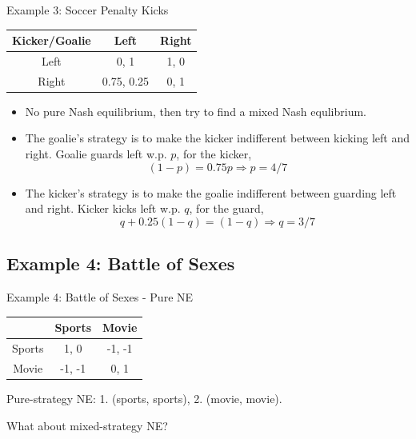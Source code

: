 \documentclass{beamer}
\begin{document}
\begin{frame}{Example 3: Soccer Penalty Kicks}
    \begin{table}[]
                \begin{tabular}{c|c|c|}
                \cline{2-3}
                        Kicker/Goalie       & Left       & Right    \\ \hline
                \multicolumn{1}{|c|}{Left}  & 0, 1       & 1, 0     \\ \hline
                \multicolumn{1}{|c|}{Right} & 0.75, 0.25 & 0, 1     \\ \hline
                \end{tabular}
    \end{table}

\begin{itemize}[<+-| alert@+>]
    \item No pure Nash equilibrium, then try to find a mixed Nash equlibrium.
    \item
    The goalie's strategy is to make the kicker indifferent between kicking left and right.
    Goalie guards left w.p. $p$, for the kicker,
    \[
    (1-p) = 0.75p \Rightarrow p = 4/7
    \]

    \item
    The kicker's strategy is to make the goalie indifferent between guarding left and right.
    Kicker kicks left w.p. $q$, for the guard,
    \[
    q + 0.25(1-q) = (1-q) \Rightarrow q = 3/7
    \] 
\end{itemize}

\end{frame}


\subsection{Example 4: Battle of Sexes}

\begin{frame}{Example 4: Battle of Sexes - Pure NE}
    \begin{table}[]
        \begin{tabular}{c|c|c|}
        \cline{2-3}
                                 & Sports    & Movie    \\ \hline
        \multicolumn{1}{|c|}{Sports}  & 1, 0 & -1, -1 \\ \hline
        \multicolumn{1}{|c|}{Movie} & -1, -1 & 0, 1 \\ \hline
        \end{tabular}
    \end{table}

\center
\alert{Pure-strategy NE: 1. (sports, sports), 2. (movie, movie)}.

What about mixed-strategy NE?
\end{frame}
\end{document}
